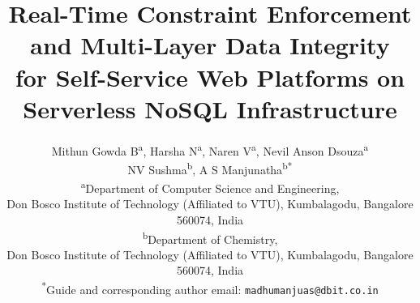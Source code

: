 \documentclass[11pt,a4paper]{article}
\theoremstyle{plain}
\theoremstyle{definition}
\begin{document}

\title{Real-Time Constraint Enforcement and Multi-Layer Data Integrity\\ for Self-Service Web Platforms on Serverless NoSQL Infrastructure}

\author{
Mithun Gowda B\textsuperscript{a}, Harsha N\textsuperscript{a}, Naren V\textsuperscript{a}, Nevil Anson Dsouza\textsuperscript{a}\\
NV Sushma\textsuperscript{b}, A S Manjunatha\textsuperscript{b}\textsuperscript{*} \\[4pt]
\small \textsuperscript{a}Department of Computer Science and Engineering,\\
\small Don Bosco Institute of Technology (Affiliated to VTU), Kumbalagodu, Bangalore 560074, India\\
\small \textsuperscript{b}Department of Chemistry,\\
\small Don Bosco Institute of Technology (Affiliated to VTU), Kumbalagodu, Bangalore 560074, India\\[2pt]
\small \textsuperscript{*}Guide and corresponding author email: \texttt{madhumanjuas@dbit.co.in}
}
\date{}

\maketitle
\end{document}
